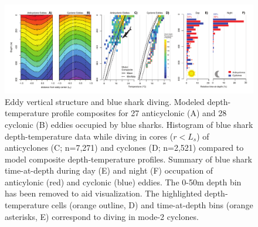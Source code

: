 
\begin{figure}[htbp]
\centering
\includegraphics[width=\textwidth]{images/C5_Fig2.pdf}
\caption{Eddy vertical structure and blue shark diving. Modeled depth-temperature profile composites for 27 anticyclonic (A) and 28 cyclonic (B) eddies occupied by blue sharks. Histogram of blue shark depth-temperature data while diving in cores ($r < L_s$) of anticyclones (C; n=7,271) and cyclones (D; n=2,521) compared to model composite depth-temperature profiles. Summary of blue shark time-at-depth during day (E) and night (F) occupation of anticylonic (red) and cyclonic (blue) eddies. The 0-50m depth bin has been removed to aid visualization. The highlighted depth-temperature cells (orange outline, D) and time-at-depth bins (orange asterisks, E) correspond to diving in mode-2 cyclones.}
\label{fig:c5f2}
\end{figure}

\clearpage

